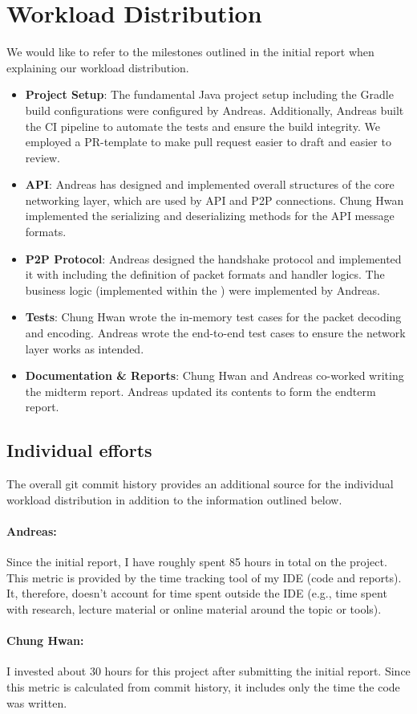 \section{Workload Distribution}\label{sec:workload-distribution}

We would like to refer to the milestones outlined in the initial report when explaining our workload distribution.

\begin{itemize}
    \setlength\itemsep{0em}
    \item \textbf{Project Setup}:
    The fundamental Java project setup including the Gradle build configurations were
    configured by Andreas.
    Additionally, Andreas built the CI pipeline to automate the tests and ensure the build integrity.
    We employed a PR-template to make pull request easier to draft and easier to review.
    \item \textbf{API}:
    Andreas has designed and implemented overall structures of the core networking layer,
    which are used by API and P2P connections.
    Chung Hwan implemented the serializing and deserializing methods for the API message formats.
    \item \textbf{P2P Protocol}:
    Andreas designed the handshake protocol and implemented it with including the definition of packet formats and handler logics.
    The business logic (implemented within the ) were implemented by Andreas.
    \item \textbf{Tests}:
    Chung Hwan wrote the in-memory test cases for the packet decoding and encoding.
    Andreas wrote the end-to-end test cases to ensure the network layer works as intended.
    \item \textbf{Documentation \& Reports}:
    Chung Hwan and Andreas co-worked writing the midterm report.
    Andreas updated its contents to form the endterm report.
\end{itemize}

\subsection{Individual efforts}\label{subsec:individual-efforts}

The overall git commit history provides an additional source for the individual workload distribution
in addition to the information outlined below.

\paragraph{Andreas:} Since the initial report, I have roughly spent 85 hours in total on the project.
This metric is provided by the time tracking tool of my IDE (code and reports).
It, therefore, doesn't account for time spent outside the
IDE  (e.g., time spent with research, lecture material or online material around the topic
or tools).

\paragraph{Chung Hwan:} I invested about 30 hours for this project after submitting the initial report.
Since this metric is calculated from commit history, it includes only the time the code was written.
